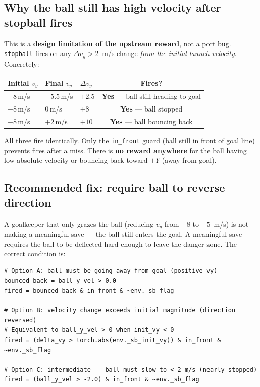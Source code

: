 \documentclass[11pt,a4paper]{article}
\begin{document}
\subsection{Why the ball still has high velocity after stopball fires}

This is a \textbf{design limitation of the upstream reward}, not a port bug.
\texttt{stopball} fires on any $\Delta v_y > 2$~m/s change \emph{from the
initial launch velocity}. Concretely:

\begin{center}
\begin{tabular}{lllc}
\toprule
Initial $v_y$ & Final $v_y$ & $\Delta v_y$ & Fires? \\
\midrule
$-8$\,m/s & $-5.5$\,m/s & $+2.5$ & \textbf{Yes} --- ball still heading to goal \\
$-8$\,m/s & $0$\,m/s    & $+8$   & \textbf{Yes} --- ball stopped \\
$-8$\,m/s & $+2$\,m/s   & $+10$  & \textbf{Yes} --- ball bouncing back \\
\bottomrule
\end{tabular}
\end{center}

All three fire identically. Only the \texttt{in\_front} guard (ball still in
front of goal line) prevents fires after a miss. There is \textbf{no reward
anywhere} for the ball having low absolute velocity or bouncing back toward
$+Y$ (away from goal).

\subsection{Recommended fix: require ball to reverse direction}
\label{subsec:stopball_fix}

A goalkeeper that only grazes the ball (reducing $v_y$ from $-8$ to $-5$~m/s)
is not making a meaningful save --- the ball still enters the goal. A meaningful
save requires the ball to be deflected hard enough to leave the danger zone.
The correct condition is:

\begin{lstlisting}[caption={Improved stopball: require ball bounces back (positive $v_y$)}]
# Option A: ball must be going away from goal (positive vy)
bounced_back = ball_y_vel > 0.0
fired = bounced_back & in_front & ~env._sb_flag

# Option B: velocity change exceeds initial magnitude (direction reversed)
# Equivalent to ball_y_vel > 0 when init_vy < 0
fired = (delta_vy > torch.abs(env._sb_init_vy)) & in_front & ~env._sb_flag

# Option C: intermediate -- ball must slow to < 2 m/s (nearly stopped)
fired = (ball_y_vel > -2.0) & in_front & ~env._sb_flag
\end{lstlisting}
\end{document}
